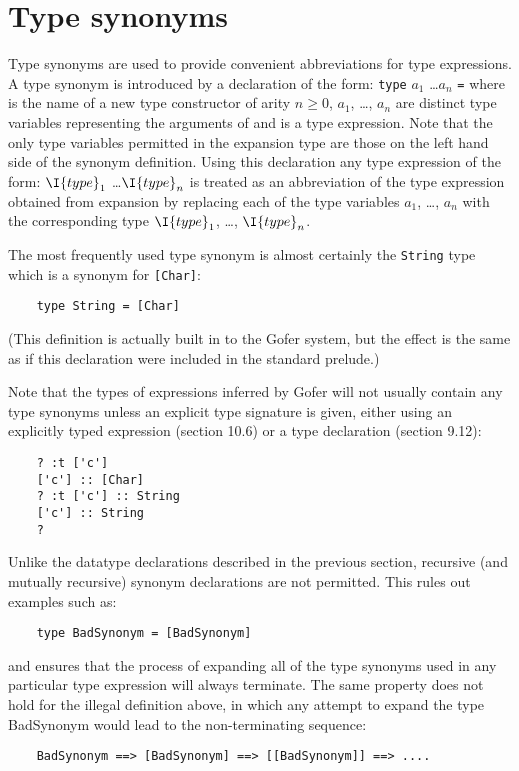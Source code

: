 \section{Type synonyms}
Type synonyms are used to provide  convenient  abbreviations  for  type
expressions.  A type synonym is introduced  by  a  declaration  of  the
form:
\BQ
    \verb"type"  $a_1$ \dots $a_n$ \verb"=" 
\EQ
where  is the name of a new type constructor  of  arity  
$n\geq 0$,  
$a_1$, \dots, $a_n$ are distinct type variables 
representing the arguments of  
and  is a type expression.  Note that the only type  variables
permitted in the expansion type are those on the left hand side of  the
synonym definition.  Using this declaration any type expression of  the
form:
\BQ
     $\I{type}_1$ \dots $\I{type}_n$ 
\EQ
is treated as an abbreviation of  the  type  expression  obtained  from
expansion by replacing each of the type variables 
$a_1$, \dots, $a_n$ with  the
corresponding type $\I{type}_1$, \dots, $\I{type}_n$.

The most frequently used type synonym is almost  certainly  the  \verb"String"
type which is a synonym for \verb"[Char]":
\begin{verbatim}
    type String = [Char]
\end{verbatim}
(This definition is actually built in to the Gofer  system,  but
the effect is the same as if this  declaration  were  included  in  the
standard prelude.)

Note that the types of expressions inferred by Gofer will  not  usually
contain any type synonyms unless an explicit type signature  is  given,
either using an explicitly typed expression (section 10.6)  or  a  type
declaration (section 9.12):
\begin{verbatim}
    ? :t ['c']
    ['c'] :: [Char]
    ? :t ['c'] :: String
    ['c'] :: String
    ?
\end{verbatim}
Unlike the datatype declarations described  in  the  previous  section,
recursive  (and  mutually  recursive)  synonym  declarations  are   not
permitted.  This rules out examples such as:
\begin{verbatim}
    type BadSynonym = [BadSynonym]
\end{verbatim}
and ensures that the process of expanding all of the type synonyms used
in any particular type expression  will  always  terminate.   The  same
property does not hold for the illegal definition above, in  which  any
attempt to expand the type BadSynonym would lead to the non-terminating
sequence:
\begin{verbatim}
    BadSynonym ==> [BadSynonym] ==> [[BadSynonym]] ==> ....
\end{verbatim}




